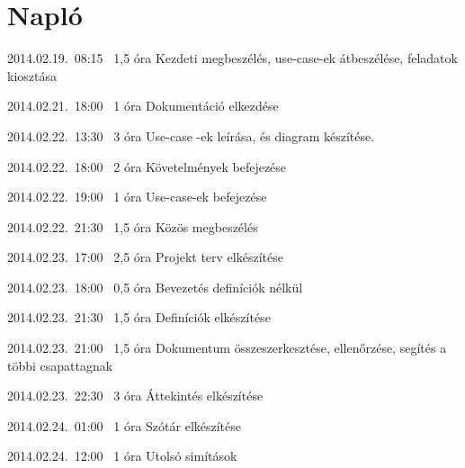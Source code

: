 %
\section{Napló}

\begin{naplo}

\bejegyzes
{2014.02.19.~08:15~}
{1,5 óra}
{\vadam\newline
\vantal\newline
\vbator\newline
\vtorok}
{Kezdeti megbeszélés, use-case-ek átbeszélése, feladatok kiosztása}

\bejegyzes
{2014.02.21.~18:00~} %
{1 óra} %
{\vantal} %
{Dokumentáció elkezdése} %

\bejegyzes
{2014.02.22.~13:30~}
{3 óra}
{\vadam}
{Use-case -ek leírása, és diagram készítése.}

\bejegyzes
{2014.02.22.~18:00~}
{2 óra}
{\vbator}
{Követelmények befejezése}

\bejegyzes
{2014.02.22.~19:00~}
{1 óra}
{\vadam}
{Use-case-ek befejezése}

\bejegyzes
{2014.02.22.~21:30~}
{1,5 óra}
{\vadam\newline
\vantal\newline
\vbator\newline
\vtorok}
{Közös megbeszélés}

\bejegyzes
{2014.02.23.~17:00~}
{2,5 óra}
{\vbator}
{Projekt terv elkészítése}

\bejegyzes
{2014.02.23.~18:00~}
{0,5 óra}
{\vantal}
{Bevezetés definíciók nélkül}

\bejegyzes
{2014.02.23.~21:30~}
{1,5 óra}
{\vantal}
{Definíciók elkészítése}

\bejegyzes
{2014.02.23.~21:00~}
{1,5 óra}
{\vbator}
{Dokumentum összeszerkesztése, ellenőrzése, segítés a többi csapattagnak}

\bejegyzes
{2014.02.23.~22:30~}
{3 óra}
{\vtorok}
{Áttekintés elkészítése}

\bejegyzes
{2014.02.24.~01:00~}
{1 óra}
{\vantal}
{Szótár elkészítése}

\bejegyzes
{2014.02.24.~12:00~}
{1 óra}
{\vadam\newline
\vantal\newline
\vbator\newline
\vtorok}
{Utolsó simítások}

\end{naplo}
